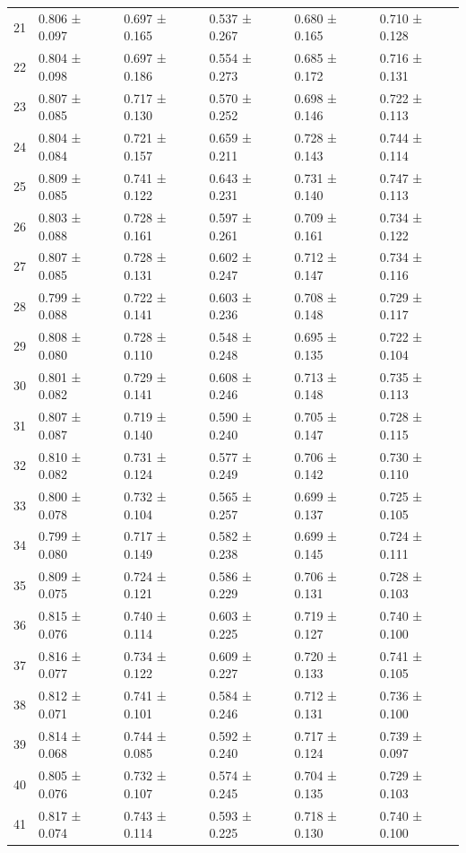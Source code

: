 \begin{tabular}{llllll}
21 & 0.806 ± 0.097 & 0.697 ± 0.165 & 0.537 ± 0.267 & 0.680 ± 0.165 & 0.710 ± 0.128 \\
22 & 0.804 ± 0.098 & 0.697 ± 0.186 & 0.554 ± 0.273 & 0.685 ± 0.172 & 0.716 ± 0.131 \\
23 & 0.807 ± 0.085 & 0.717 ± 0.130 & 0.570 ± 0.252 & 0.698 ± 0.146 & 0.722 ± 0.113 \\
24 & 0.804 ± 0.084 & 0.721 ± 0.157 & 0.659 ± 0.211 & 0.728 ± 0.143 & 0.744 ± 0.114 \\
25 & 0.809 ± 0.085 & 0.741 ± 0.122 & 0.643 ± 0.231 & 0.731 ± 0.140 & 0.747 ± 0.113 \\
26 & 0.803 ± 0.088 & 0.728 ± 0.161 & 0.597 ± 0.261 & 0.709 ± 0.161 & 0.734 ± 0.122 \\
27 & 0.807 ± 0.085 & 0.728 ± 0.131 & 0.602 ± 0.247 & 0.712 ± 0.147 & 0.734 ± 0.116 \\
28 & 0.799 ± 0.088 & 0.722 ± 0.141 & 0.603 ± 0.236 & 0.708 ± 0.148 & 0.729 ± 0.117 \\
29 & 0.808 ± 0.080 & 0.728 ± 0.110 & 0.548 ± 0.248 & 0.695 ± 0.135 & 0.722 ± 0.104 \\
30 & 0.801 ± 0.082 & 0.729 ± 0.141 & 0.608 ± 0.246 & 0.713 ± 0.148 & 0.735 ± 0.113 \\
31 & 0.807 ± 0.087 & 0.719 ± 0.140 & 0.590 ± 0.240 & 0.705 ± 0.147 & 0.728 ± 0.115 \\
32 & 0.810 ± 0.082 & 0.731 ± 0.124 & 0.577 ± 0.249 & 0.706 ± 0.142 & 0.730 ± 0.110 \\
33 & 0.800 ± 0.078 & 0.732 ± 0.104 & 0.565 ± 0.257 & 0.699 ± 0.137 & 0.725 ± 0.105 \\
34 & 0.799 ± 0.080 & 0.717 ± 0.149 & 0.582 ± 0.238 & 0.699 ± 0.145 & 0.724 ± 0.111 \\
35 & 0.809 ± 0.075 & 0.724 ± 0.121 & 0.586 ± 0.229 & 0.706 ± 0.131 & 0.728 ± 0.103 \\
36 & 0.815 ± 0.076 & 0.740 ± 0.114 & 0.603 ± 0.225 & 0.719 ± 0.127 & 0.740 ± 0.100 \\
37 & 0.816 ± 0.077 & 0.734 ± 0.122 & 0.609 ± 0.227 & 0.720 ± 0.133 & 0.741 ± 0.105 \\
38 & 0.812 ± 0.071 & 0.741 ± 0.101 & 0.584 ± 0.246 & 0.712 ± 0.131 & 0.736 ± 0.100 \\
39 & 0.814 ± 0.068 & 0.744 ± 0.085 & 0.592 ± 0.240 & 0.717 ± 0.124 & 0.739 ± 0.097 \\
40 & 0.805 ± 0.076 & 0.732 ± 0.107 & 0.574 ± 0.245 & 0.704 ± 0.135 & 0.729 ± 0.103 \\
41 & 0.817 ± 0.074 & 0.743 ± 0.114 & 0.593 ± 0.225 & 0.718 ± 0.130 & 0.740 ± 0.100 \\

\end{tabular}
